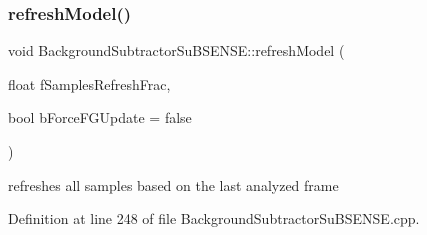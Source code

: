 \subsubsection{\texorpdfstring{refresh\+Model()}{refreshModel()}}
{\footnotesize\ttfamily void Background\+Subtractor\+Su\+B\+S\+E\+N\+S\+E\+::refresh\+Model (\begin{DoxyParamCaption}\item[{float}]{f\+Samples\+Refresh\+Frac,  }\item[{bool}]{b\+Force\+F\+G\+Update = {\ttfamily false} }\end{DoxyParamCaption})\hspace{0.3cm}{\ttfamily [virtual]}}



refreshes all samples based on the last analyzed frame 



Definition at line 248 of file Background\+Subtractor\+Su\+B\+S\+E\+N\+S\+E.\+cpp.


